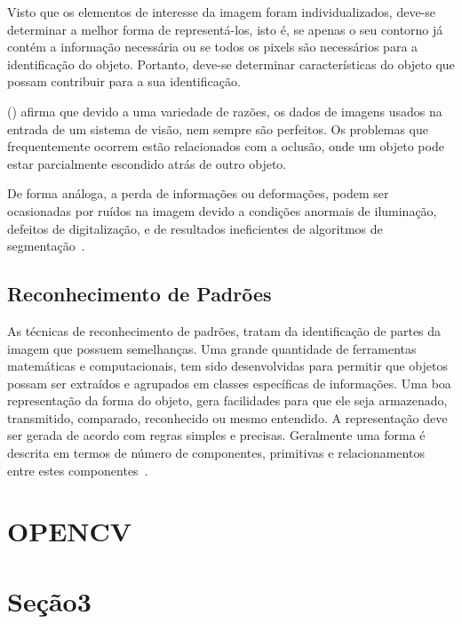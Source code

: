 Visto que os elementos de interesse da imagem foram individualizados, deve-se determinar a melhor forma de representá-los, isto é, se apenas o seu contorno já contém a informação necessária ou se todos os pixels são necessários para a identificação do objeto. Portanto, deve-se determinar características do objeto que possam contribuir para a sua identificação.

\citeauthor{rudek2001visao} (\citeyear{rudek2001visao}) afirma que devido a uma variedade de razões, os dados de imagens usados na entrada de um sistema de visão, nem sempre são perfeitos. Os problemas que frequentemente ocorrem estão relacionados com a oclusão, onde um objeto pode estar parcialmente escondido atrás de outro objeto. 

De forma análoga, a perda de informações ou deformações, podem ser ocasionadas por ruídos na imagem devido a condições anormais de iluminação, defeitos de digitalização, e de resultados ineficientes de algoritmos de segmentação~\cite{beis1999indexing}.

\subsection{Reconhecimento de Padrões}
\label{subsec:recPadroes}

As técnicas de reconhecimento de padrões, tratam da identificação de partes da imagem que possuem semelhanças. Uma grande quantidade de ferramentas matemáticas e computacionais, tem sido desenvolvidas para permitir que objetos possam ser extraídos e agrupados em classes específicas de informações. Uma boa representação da forma do objeto, gera facilidades para que ele seja armazenado, transmitido, comparado, reconhecido ou mesmo entendido. A representação deve ser gerada de acordo com regras simples e precisas. Geralmente uma forma é descrita em termos de número de componentes, primitivas e relacionamentos entre estes componentes~\cite{rudek2001visao}.

\section{OPENCV}
\label{sec:openCV}



\section{Seção3}
\label{sec:EstimarF0}


 
